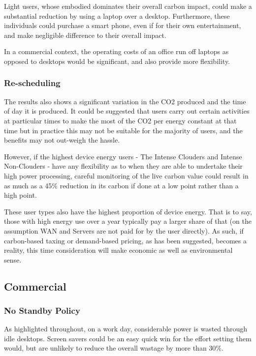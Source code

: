 \documentclass[conference]{IEEEtran}
\begin{document}
Light users, whose embodied dominates their overall carbon impact,
could make a substantial reduction by using a laptop over a
desktop. Furthermore, these individuals could purchase a smart phone,
even if for their own entertainment, and make negligible difference to
their overall impact.

In a commercial context, the operating costs of an office run off
laptops as opposed to desktops would be significant, and also provide
more flexibility.

\subsubsection{Re-scheduling}

The results also shows a significant variation in the CO2 produced and
the time of day it is produced. It could be suggested that users carry
out certain activities at particular times to make the most of the CO2
per energy constant at that time but in practice this may not be
suitable for the majority of users, and the benefits may not out-weigh
the hassle.

However, if the highest device energy users - The Intense Clouders and
Intense Non-Clouders - have any flexibility as to when they are able
to undertake their high power processing, careful monitoring of the
live carbon value could result in as much as a 45\% reduction in its
carbon if done at a low point rather than a high point.

These user types also have the highest proportion of device
energy. That is to say, those with high energy use over a year
typically pay a larger share of that (on the assumption WAN and
Servers are not paid for by the user directly). As such, if
carbon-based taxing or demand-based pricing, as has been suggested,
becomes a reality, this time consideration will make economic as well
as environmental sense.

\subsection{Commercial}

\subsubsection{No Standby Policy}

As highlighted throughout, on a work day, considerable power is wasted
through idle desktops. Screen savers could be an easy quick win for
the effort setting them would, but are unlikely to reduce the overall
wastage by more than 30\%.
\end{document}
